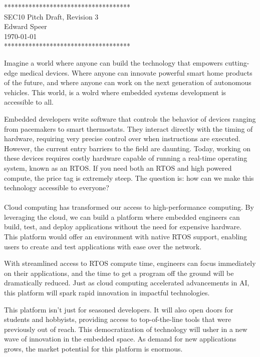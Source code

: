 \documentclass{article}
\newcommand{\HWNUM}{3}
\begin{document}

    \begin{center}
        ************************************ \\
        SEC10 Pitch Draft, Revision \HWNUM \\
        Edward Speer \\
        \today \\
        ************************************
    \end{center}

Imagine a world where anyone can build the technology that empowers cutting-edge
medical devices. Where anyone can innovate powerful smart home products of the
future, and where anyone can work on the next generation of autonomous vehicles.
This world, is a wolrd where embedded systems development is accessible to all.

Embedded developers write software that controls the behavior of devices 
ranging from pacemakers to smart thermostats. They interact directly with 
the timing of hardware, requiring very precise control over when instructions
are executed. However, the current entry barriers to the field are
daunting. Today, working on these devices requires costly hardware capable
of running a real-time operating system, known as an RTOS. If you need both an
RTOS and high powered compute, the price tag is extremely steep. The question
is: how can we make this technology accessible to everyone? \\ \hfill \\

Cloud computing has transformed our access to high-performance computing. By
leveraging the cloud, we can build a platform where embedded engineers can
build, test, and deploy applications without the need for expensive hardware.
This platform would offer an environment with native RTOS support, enabling
users to create and test applications with ease over the network.

With streamlined access to RTOS compute time, engineers can focus immediately
on their applications, and the time to get a program off the ground will be 
dramatically reduced. Just as cloud computing accelerated advancements in AI,
this platform will spark rapid innovation in impactful technologies.

This platform isn't just for seasoned developers. It will also open doors for
students and hobbyists, providing access to top-of-the-line tools that were
previously out of reach. This democratization of technology will usher in a
new wave of innovation in the embedded space. As demand for new
applications grows, the market potential for this platform is enormous.
\end{document}
